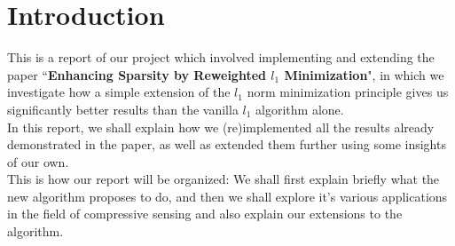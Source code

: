 \documentclass[a4paper,14pt]{article}
\numberwithin{definition}{section}
\numberwithin{mytheorem}{subsection}
\begin{document}

\date{Spring 2022}
\maketitle

\justifying
\tableofcontents

\newpage
\justifying
\section*{Introduction}
This is a report of our project which involved implementing and extending the paper ``\textbf{Enhancing Sparsity by Reweighted $l_1$ Minimization}", in which we investigate how a simple extension of the $l_1$ norm minimization principle gives us significantly better results than the vanilla $l_1$ algorithm alone.\\
In this report, we shall explain how we (re)implemented all the results already demonstrated in the paper, as well as extended them further using some insights of our own.\\
This is how our report will be organized: We shall first explain briefly what the new algorithm proposes to do, and then we shall explore it's various applications in the field of compressive sensing and also explain our extensions to the algorithm.
\end{document}
